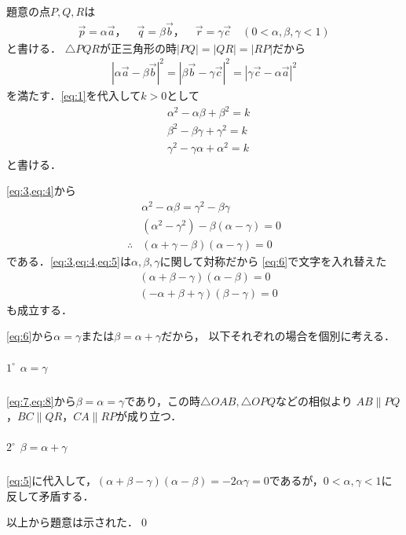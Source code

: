 \documentclass[../../main.tex]{subfiles}
\begin{document}
題意の点$P,Q,R$は
\begin{align}
  \vec p=\alpha\vec a，\quad
  \vec q=\beta\vec b，\quad
  \vec r=\gamma\vec c\quad(0<\alpha,\beta,\gamma<1) \label{eq:2}
\end{align}
と書ける．
$\triangle PQR$が正三角形の時$|PQ|=|QR|=|RP|$だから
\begin{align}
  |\alpha\vec a-\beta\vec b|^2=|\beta\vec b-\gamma\vec c|^2=|\gamma\vec c-\alpha\vec a|^2
\end{align}
を満たす．\cref{eq:1}を代入して$k>0$として
\begin{align}
  & \alpha^2-\alpha\beta+\beta^2=k \label{eq:3} \\
  & \beta^2-\beta\gamma+\gamma^2=k \label{eq:4}\\
  & \gamma^2-\gamma\alpha+\alpha^2=k \label{eq:5}
\end{align}
と書ける．

\cref{eq:3,eq:4}から
\begin{align}
  &\alpha^2-\alpha\beta=\gamma^2-\beta\gamma\\
  &(\alpha^2-\gamma^2)-\beta(\alpha-\gamma)=0\\
  \therefore
  &(\alpha+\gamma-\beta)(\alpha-\gamma)=0 \label{eq:6}
\end{align}
である．\cref{eq:3,eq:4,eq:5}は$\alpha,\beta,\gamma$に関して対称だから
\cref{eq:6}で文字を入れ替えた
\begin{align}
  & (\alpha+\beta-\gamma)(\alpha-\beta)=0 \label{eq:7} \\
  & (-\alpha+\beta+\gamma)(\beta-\gamma)=0 \label{eq:8}
\end{align}
も成立する．

\cref{eq:6}から$\alpha=\gamma$または$\beta=\alpha+\gamma$だから，
以下それぞれの場合を個別に考える．

\subparagraph{$1^\circ$ $\alpha=\gamma$}

\cref{eq:7,eq:8}から$\beta=\alpha=\gamma$であり，この時$\triangle OAB, \triangle OPQ$などの相似より
$AB\parallel PQ$，$BC\parallel QR$，$CA\parallel RP$が成り立つ．

\subparagraph{$2^\circ$ $\beta=\alpha+\gamma$}

\cref{eq:5}に代入して，$(\alpha+\beta-\gamma)(\alpha-\beta)=-2\alpha\gamma=0$であるが，$0<\alpha,\gamma<1$に反して矛盾する．
\casesend

以上から題意は示された．\qed

\newpage
\end{document}
